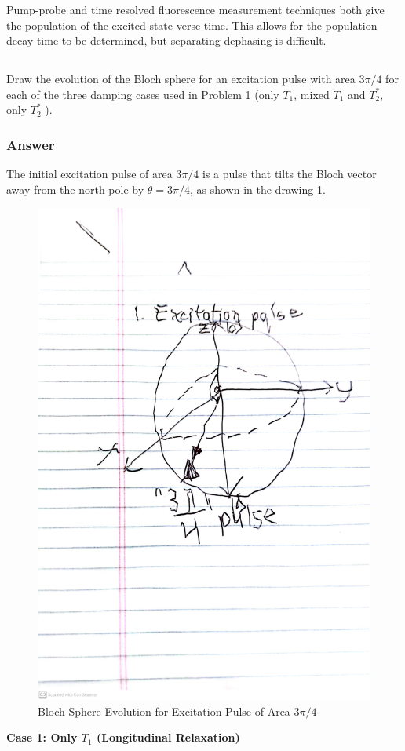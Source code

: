 \documentclass[12pt]{article}
\begin{document}
Pump-probe and time resolved fluorescence measurement techniques both give the population of the excited state verse time. This allows for the population decay time to be determined, but separating dephasing is difficult.
\subsection{}
Draw the evolution of the Bloch sphere for an excitation pulse with area $3 \pi / 4$ for each of the three damping cases used in Problem 1 (only $T_{1}$, mixed $T_{1}$ and $T_{2}^{*}$, only $T_{2}^{*}$ ).
\subsubsection{Answer}
The initial excitation pulse of area \(3\pi/4\) is a pulse that tilts the Bloch vector away from the north pole by $\theta = 3\pi/4$, as shown in the drawing \ref{fig:bloch}.
\begin{figure}
    \centering
    \includegraphics[width=\textwidth]{CamScanner 05-19-2024 21.01.jpg}
\caption{Bloch Sphere Evolution for Excitation Pulse of Area \(3\pi/4\)}
\label{fig:bloch}
\end{figure}
\textbf{Case 1: Only \(T_1\) (Longitudinal Relaxation)}
\end{document}
